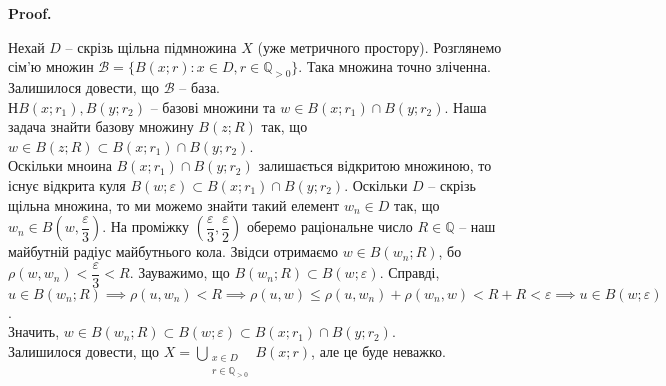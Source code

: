 \documentclass[a4paper, 10pt]{article}
\makeatletter
\theoremstyle{theoremdd}
\renewenvironment{proof}[1][Proof.\\]{\par
\pushQED{\hfill \qed}%
\normalfont \topsep6\p@\@plus6\p@\relax
\trivlist
\item\relax
{\bfseries
#1\@addpunct{.}}\hspace\labelsep\ignorespaces
}{%
\popQED\endtrivlist\@endpefalse
}
\makeatother
\begin{document}
\begin{proof}
Нехай $D$ -- скрізь щільна підмножина $X$ (уже метричного простору). Розглянемо сім'ю множин $\mathcal{B} = \{ B(x;r) : x \in D, r \in \mathbb{Q}_{>0} \}$. Така множина точно зліченна. Залишилося довести, що $\mathcal{B}$ -- база.\\
Н $B(x;r_1), B(y;r_2)$ -- базові множини та $w \in B(x;r_1) \cap B(y;r_2)$. Наша задача знайти базову множину $B(z;R)$ так, що $w \in B(z;R) \subset B(x;r_1) \cap B(y;r_2)$.\\
Оскільки мноина $B(x;r_1) \cap B(y;r_2)$ залишається відкритою множиною, то існує відкрита куля $B(w;\varepsilon) \subset B(x;r_1) \cap B(y;r_2)$. Оскільки $D$ -- скрізь щільна множина, то ми можемо знайти такий елемент $w_n \in D$ так, що $w_n \in B\left(w, \dfrac{\varepsilon}{3}\right)$. На проміжку $\left( \dfrac{\varepsilon}{3},\dfrac{\varepsilon}{2} \right)$ оберемо раціональне число $R \in \mathbb{Q}$ -- наш майбутній радіус майбутнього кола. Звідси отримаємо $w \in B(w_n;R)$, бо $\rho(w,w_n) < \dfrac{\varepsilon}{3} < R$. Зауважимо, що $B(w_n;R) \subset B(w;\varepsilon)$. Справді,\\
$u \in B(w_n;R) \implies \rho(u,w_n) < R \implies \rho(u,w) \leq \rho(u,w_n) + \rho(w_n,w) < R + R < \varepsilon \implies u \in B(w;\varepsilon)$.\\
Значить, $w \in B(w_n;R) \subset B(w;\varepsilon) \subset B(x;r_1) \cap B(y;r_2)$.\\
Залишилося довести, що $X = \displaystyle\bigcup_{\substack{x \in D \\ r \in \mathbb{Q}_{>0}}} B(x;r)$, але це буде неважко.
\end{proof}
\end{document}
